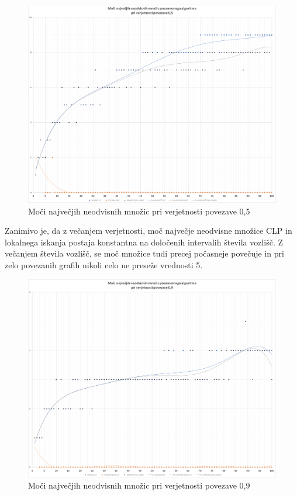\documentclass[a4paper, 12 pt]{article}
\theoremstyle{definition}
\theoremstyle{plain}
\theoremstyle{remark}
\begin{document}
\begin{figure}[H]
\centering
  \includegraphics[scale=0.28]{0,5 moci.png}
  \caption{Moči največjih neodvisnih množic pri verjetnosti povezave 0,5}
  \label{fig:moc0,5} 
\end{figure}

Zanimivo je, da z večanjem verjetnosti, moč največje neodvisne množice CLP in lokalnega iskanja postaja konstantna na določenih intervalih števila vozlišč. Z večanjem števila vozlišč, se moč množice tudi precej počasneje povečuje in pri zelo povezanih grafih nikoli celo ne preseže vrednosti 5.


\begin{figure}[H]
\centering
  \includegraphics[scale=0.28]{0,9 moci.png}
  \caption{Moči največjih neodvisnih množic pri verjetnosti povezave 0,9}
  \label{fig:moc0,9} 
\end{figure}
\end{document}
